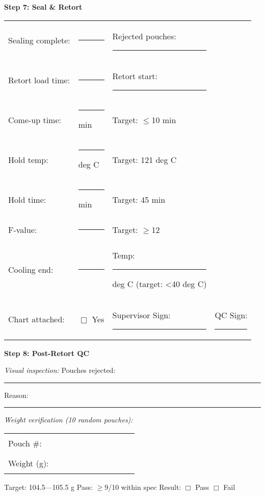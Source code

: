 {\noindent\textbf{Step 7: Seal \& Retort}

\begin{tabular}{@{}lp{3cm}p{3cm}p{3cm}@{}}
Sealing complete: & \rule{2.5cm}{0.4pt} & Rejected pouches: \rule{2cm}{0.4pt} & \\
Retort load time: & \rule{2.5cm}{0.4pt} & Retort start: \rule{2.5cm}{0.4pt} & \\
Come-up time: & \rule{2.5cm}{0.4pt} min & Target: $\le$10 min & \\
Hold temp: & \rule{2.5cm}{0.4pt} deg C & Target: 121 deg C & \\
Hold time: & \rule{2.5cm}{0.4pt} min & Target: 45 min & \\
F-value: & \rule{2.5cm}{0.4pt} & Target: $\ge$12 & \\
Cooling end: & \rule{2.5cm}{0.4pt} & Temp: \rule{2cm}{0.4pt} deg C (target: <40 deg C) & \\
Chart attached: & $\Box$ Yes & Supervisor Sign: \rule{2.5cm}{0.4pt} & QC Sign: \rule{2.5cm}{0.4pt} \\
\end{tabular}

\vspace{1em}

\noindent\textbf{Step 8: Post-Retort QC}

\noindent\textit{Visual inspection:} Pouches rejected: \rule{2cm}{0.4pt} \hspace{1cm} Reason: \rule{6cm}{0.4pt}

\vspace{0.5em}

\noindent\textit{Weight verification (10 random pouches):}

\begin{tabular}{@{}lcccccccccc@{}}
Pouch \#: & \rule{1cm}{0.4pt} & \rule{1cm}{0.4pt} & \rule{1cm}{0.4pt} & \rule{1cm}{0.4pt} & \rule{1cm}{0.4pt} & \rule{1cm}{0.4pt} & \rule{1cm}{0.4pt} & \rule{1cm}{0.4pt} & \rule{1cm}{0.4pt} & \rule{1cm}{0.4pt} \\
Weight (g): & \rule{1cm}{0.4pt} & \rule{1cm}{0.4pt} & \rule{1cm}{0.4pt} & \rule{1cm}{0.4pt} & \rule{1cm}{0.4pt} & \rule{1cm}{0.4pt} & \rule{1cm}{0.4pt} & \rule{1cm}{0.4pt} & \rule{1cm}{0.4pt} & \rule{1cm}{0.4pt} \\
\end{tabular}

\noindent Target: 104.5---105.5 g \hspace{2cm} Pass: $\ge$9/10 within spec \hspace{2cm} Result: $\Box$ Pass $\Box$ Fail

}
